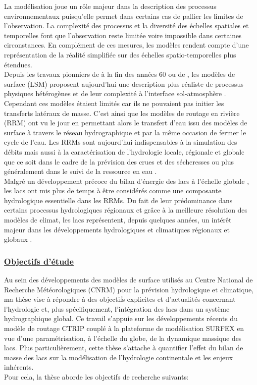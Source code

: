 La modélisation joue un rôle majeur dans la description des processus environnementaux puisqu'elle permet dans certains cas de pallier les limites de l'observation. La complexité des processus et la diversité des échelles spatiales et temporelles font que l'observation reste limitée voire impossible dans certaines circonstances. En complément de ces mesures, les modèles rendent compte d'une représentation de la réalité simplifiée sur des échelles spatio-temporelles plus étendues. \\
Depuis les travaux pionniers de \citet{manabe1969} à la fin des années 60 ou de \citet{deardorff1977}, les modèles de surface (LSM) proposent aujourd'hui une description plus réaliste de processus physiques hétérogènes et de leur complexité à l'interface sol-atmosphère \citep{levis2010}. Cependant ces modèles étaient limités car ils ne pouvaient pas initier les transferts latéraux de masse. C'est ainsi que les modèles de routage en rivière (RRM) ont vu le jour en permettant alors le transfert d'eau issu des modèles de surface à travers le réseau hydrographique et par la même occasion de fermer le cycle de l'eau. Les RRMs sont aujourd'hui indispensables à la simulation des débits mais aussi à la caractérisation de l'hydrologie locale, régionale et globale que ce soit dans le cadre de la prévision des crues et des sécheresses ou plus généralement dans le suivi de la ressource en eau \citep{ducharne2003, lucas2003, lam2011, zajac2017}.\\
Malgré un développement précoce du bilan d'énergie des lacs à l'échelle globale \citep{lemoigne2016,piccolroaz2020, woolway2017a}, les lacs ont mis plus de temps à être considérés comme une composante hydrologique essentielle dans les RRMs. Du fait de leur prédominance dans certains processus hydrologiques régionaux et grâce à la meilleure résolution des modèles de climat, les lacs représentent, depuis quelques années, un intérêt majeur dans les développements hydrologiques et climatiques régionaux et globaux \citep{bowling2010,cherkauer2010,burek2013}.\\
\clearpage

\subsubsection*{\underline{{\selectfont Objectifs d'étude}}}

Au sein des développements des modèles de surface utilisés au Centre National de Recherche Météorologiques (CNRM) pour la prévision hydrologique et climatique, ma thèse vise à répondre à des objectifs explicites et d'actualités concernant l'hydrologie et, plus spécifiquement, l'intégration des lacs dans un système hydrographique global. Ce travail s'appuie sur les développements récents du modèle de routage CTRIP couplé à la plateforme de modélisation SURFEX \citep{decharme2019} en vue d'une paramétrisation, à l'échelle du globe, de la dynamique massique des lacs. Plus particulièrement, cette thèse s'attache à quantifier l'effet du bilan de masse des lacs sur la modélisation de l'hydrologie continentale et les enjeux inhérents. \\
Pour cela, la thèse aborde les objectifs de recherche suivants: \\

